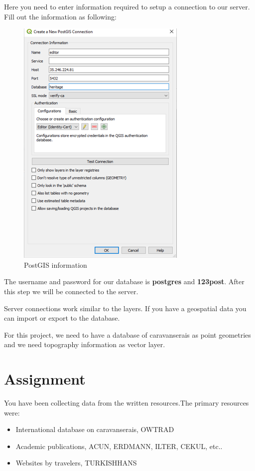 \documentclass[
]{book}
\providecommand{\tightlist}{%
  \setlength{\itemsep}{0pt}\setlength{\parskip}{0pt}}
\begin{document}
Here you need to enter information required to setup a connection to our server. Fill out the information as following:

\begin{figure}
\centering
\includegraphics{Images/postGISinfo.png}
\caption{PostGIS information}
\end{figure}

The username and password for our database is \textbf{postgres} and \textbf{123post}. After this step we will be connected to the server.

Server connections work similar to the layers. If you have a geospatial data you can import or export to the database.

For this project, we need to have a database of caravanserais as point geometries and we need topography information as vector layer.

\hypertarget{assignment}{%
\chapter{Assignment}\label{assignment}}

You have been collecting data from the written resources.The primary resources were:

\begin{itemize}
\tightlist
\item
  International database on caravanserais, OWTRAD
\item
  Academic publications, ACUN, ERDMANN, ILTER, CEKUL, etc..
\item
  Websites by travelers, TURKISHHANS
\end{itemize}
\end{document}
